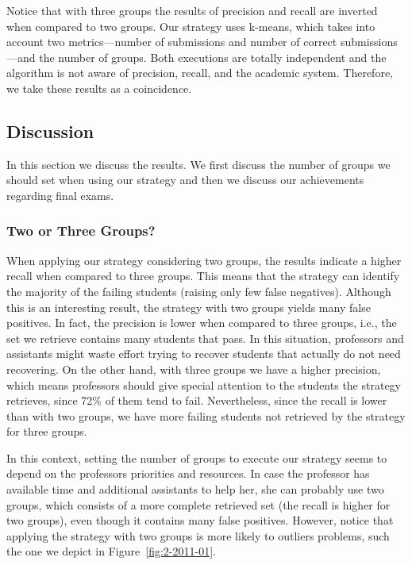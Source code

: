 Notice that with three groups the results of precision and recall are inverted when compared to two groups. Our strategy uses k-means, which takes into account two metrics---number of submissions and number of correct submissions---and the number of groups. Both executions are totally independent and the algorithm is not aware of precision, recall, and the academic system. Therefore, we take these results as a coincidence.

\subsection{Discussion}

In this section we discuss the results. We first discuss the number of groups we should set when using our strategy and then we discuss our achievements regarding final exams.

\subsubsection{Two or Three Groups?}

When applying our strategy considering two groups, the results indicate a higher recall when compared to three groups. This means that the strategy can identify the majority of the failing students (raising only few false negatives). Although this is an interesting result, the strategy with two groups yields many false positives. In fact, the precision is lower when compared to three groups, i.e., the set we retrieve contains many students that pass. In this situation, professors and assistants might waste effort trying to recover students that actually do not need recovering. On the other hand, with three groups we have a higher precision, which means professors should give special attention to the students the strategy retrieves, since 72\% of them tend to fail. Nevertheless, since the recall is lower than with two groups, we have more failing students not retrieved by the strategy for three groups.


In this context, setting the number of groups to execute our strategy seems to depend on the professors priorities and resources. In case the professor has available time and additional assistants to help her, she can probably use two groups, which consists of a more complete retrieved set (the recall is higher for two groups), even though it contains many false positives. However, notice that applying the strategy with two groups is more likely to outliers problems, such the one we depict in Figure~\ref{fig:2-2011-01}.

